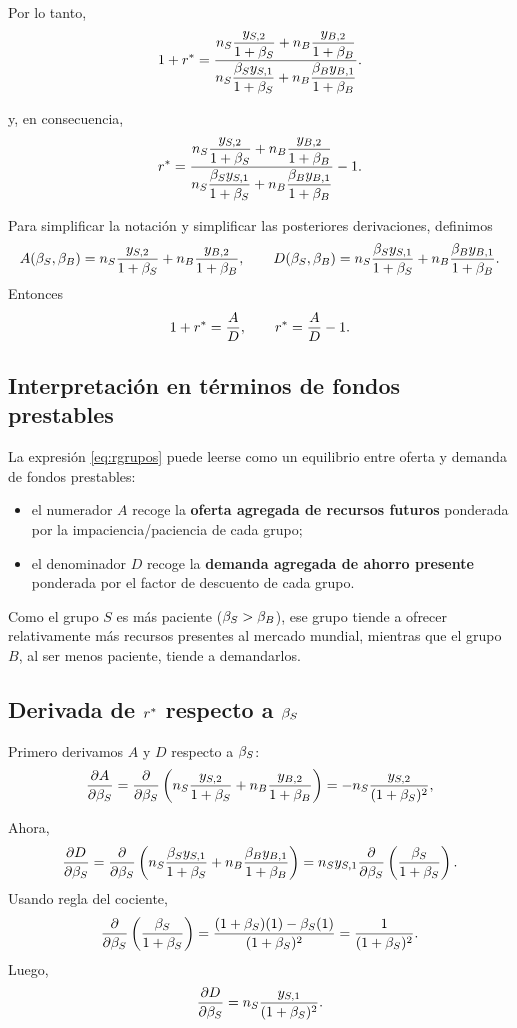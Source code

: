 Por lo tanto,
\begin{equation}
1+r^*
=
\frac{n_S \dfrac{y_{S,2}}{1+\beta_S} + n_B \dfrac{y_{B,2}}{1+\beta_B}}
{n_S \dfrac{\beta_S y_{S,1}}{1+\beta_S} + n_B \dfrac{\beta_B y_{B,1}}{1+\beta_B}}.
\label{eq:rgrupos}
\end{equation}

y, en consecuencia,
\begin{equation}
r^*
=
\frac{n_S \dfrac{y_{S,2}}{1+\beta_S} + n_B \dfrac{y_{B,2}}{1+\beta_B}}
{n_S \dfrac{\beta_S y_{S,1}}{1+\beta_S} + n_B \dfrac{\beta_B y_{B,1}}{1+\beta_B}} - 1.
\label{eq:rfinal}
\end{equation}

Para simplificar la notación y simplificar las posteriores derivaciones, definimos
\[
A(\beta_S,\beta_B)
=
n_S \frac{y_{S,2}}{1+\beta_S} + n_B \frac{y_{B,2}}{1+\beta_B},
\qquad
D(\beta_S,\beta_B)
=
n_S \frac{\beta_S y_{S,1}}{1+\beta_S} + n_B \frac{\beta_B y_{B,1}}{1+\beta_B}.
\]
Entonces
\[
1+r^* = \frac{A}{D},
\qquad
r^* = \frac{A}{D} - 1.
\]

\subsection*{Interpretación en términos de fondos prestables}
La expresión \eqref{eq:rgrupos} puede leerse como un equilibrio entre oferta y demanda de fondos prestables:
\begin{itemize}[leftmargin=1.2cm]
    \item el numerador $A$ recoge la \textbf{oferta agregada de recursos futuros} ponderada por la impaciencia/paciencia de cada grupo;
    \item el denominador $D$ recoge la \textbf{demanda agregada de ahorro presente} ponderada por el factor de descuento de cada grupo.
\end{itemize}

Como el grupo $S$ es más paciente ($\beta_S > \beta_B$), ese grupo tiende a ofrecer relativamente más recursos presentes al mercado mundial, mientras que el grupo $B$, al ser menos paciente, tiende a demandarlos.

\subsection*{Derivada de $r^*$ respecto a $\beta_S$}
Primero derivamos $A$ y $D$ respecto a $\beta_S$:
\[
\frac{\partial A}{\partial \beta_S}
=
\frac{\partial}{\partial \beta_S}
\left(
n_S \frac{y_{S,2}}{1+\beta_S} + n_B \frac{y_{B,2}}{1+\beta_B}
\right)
=
-n_S \frac{y_{S,2}}{(1+\beta_S)^2},
\]

Ahora,
\[
\frac{\partial D}{\partial \beta_S}
=
\frac{\partial}{\partial \beta_S}
\left(
n_S \frac{\beta_S y_{S,1}}{1+\beta_S} + n_B \frac{\beta_B y_{B,1}}{1+\beta_B}
\right)
=
n_S y_{S,1}
\frac{\partial}{\partial \beta_S}
\left(
\frac{\beta_S}{1+\beta_S}
\right).
\]
Usando regla del cociente,
\[
\frac{\partial}{\partial \beta_S}
\left(
\frac{\beta_S}{1+\beta_S}
\right)
=
\frac{(1+\beta_S)(1) - \beta_S(1)}{(1+\beta_S)^2}
=
\frac{1}{(1+\beta_S)^2}.
\]
Luego,
\[
\frac{\partial D}{\partial \beta_S}
=
n_S \frac{y_{S,1}}{(1+\beta_S)^2}.
\]

